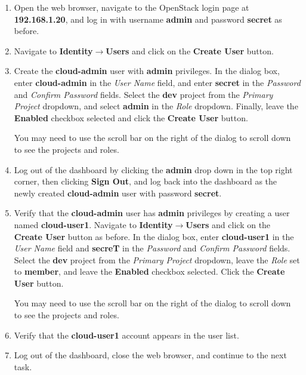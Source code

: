 \documentclass[letterpaper, 12pt]{article}
\begin{document}
\begin{enumerate}
    \item Open the web browser, navigate to the OpenStack login page at \textbf{192.168.1.20}, and log in with username
    \textbf{admin} and password \textbf{secret} as before.

    \item Navigate to \textbf{Identity$\rightarrow$Users} and click on the \textbf{Create User} button.
    
    \item Create the \textbf{cloud-admin} user with \textbf{admin} privileges. In the dialog box, enter
    \textbf{cloud-admin} in the \textit{User Name} field, and enter \textbf{secret} in the \textit{Password} and
    \textit{Confirm Password} fields. Select the \textbf{dev} project from the \textit{Primary Project} dropdown, and
    select \textbf{admin} in the \textit{Role} dropdown. Finally, leave the \textbf{Enabled} checkbox selected and click
    the \textbf{Create User} button.

    \begin{tipbox}{}
        You may need to use the scroll bar on the right of the dialog to scroll down to see the projects and roles.
    \end{tipbox}

    \item Log out of the dashboard by clicking the \textbf{admin} drop down in the top right corner, then clicking
    \textbf{Sign Out}, and log back into the dashboard as the newly created \textbf{cloud-admin} user with password
    \textbf{secret}.

    \item Verify that the \textbf{cloud-admin} user has \textbf{admin} privileges by creating a user named
    \textbf{cloud-user1}. Navigate to \textbf{Identity$\rightarrow$Users} and click on the \textbf{Create User} button
    as before. In the dialog box, enter \textbf{cloud-user1} in the \textit{User Name} field and \textbf{secreT} in the
    \textit{Password} and \textit{Confirm Password} fields. Select the \textbf{dev} project from the \textit{Primary
    Project} dropdown, leave the \textit{Role} set to \textbf{member}, and leave the \textbf{Enabled} checkbox
    selected. Click the \textbf{Create User} button.

    \begin{tipbox}{}
        You may need to use the scroll bar on the right of the dialog to scroll down to see the projects and roles.
    \end{tipbox}

    \item Verify that the \textbf{cloud-user1} account appears in the user list.
    
    \item Log out of the dashboard, close the web browser, and continue to the next task.
\end{enumerate}
\end{document}
